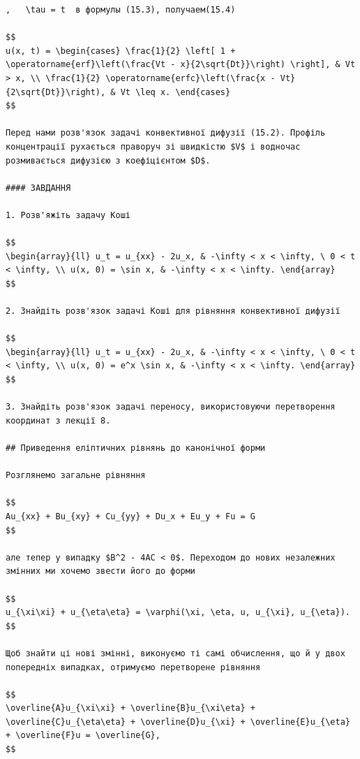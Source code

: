 \documentclass[
  ukrainian,
]{article}
\begin{document}
\begin{verbatim}
,   \tau = t  в формулы (15.3), получаем(15.4)

$$
u(x, t) = \begin{cases} \frac{1}{2} \left[ 1 + \operatorname{erf}\left(\frac{Vt - x}{2\sqrt{Dt}}\right) \right], & Vt > x, \\ \frac{1}{2} \operatorname{erfc}\left(\frac{x - Vt}{2\sqrt{Dt}}\right), & Vt \leq x. \end{cases}
$$

Перед нами розв'язок задачі конвективної дифузії (15.2). Профіль концентрації рухається праворуч зі швидкістю $V$ і водночас розмивається дифузією з коефіцієнтом $D$.

#### ЗАВДАННЯ

1. Розв'яжіть задачу Коші

$$
\begin{array}{ll} u_t = u_{xx} - 2u_x, & -\infty < x < \infty, \ 0 < t < \infty, \\ u(x, 0) = \sin x, & -\infty < x < \infty. \end{array}
$$

2. Знайдіть розв'язок задачі Коші для рівняння конвективної дифузії

$$
\begin{array}{ll} u_t = u_{xx} - 2u_x, & -\infty < x < \infty, \ 0 < t < \infty, \\ u(x, 0) = e^x \sin x, & -\infty < x < \infty. \end{array}
$$

3. Знайдіть розв'язок задачі переносу, використовуючи перетворення координат з лекції 8.

## Приведення еліптичних рівнянь до канонічної форми

Розглянемо загальне рівняння

$$
Au_{xx} + Bu_{xy} + Cu_{yy} + Du_x + Eu_y + Fu = G
$$

але тепер у випадку $B^2 - 4AC < 0$. Переходом до нових незалежних змінних ми хочемо звести його до форми

$$
u_{\xi\xi} + u_{\eta\eta} = \varphi(\xi, \eta, u, u_{\xi}, u_{\eta}).
$$

Щоб знайти ці нові змінні, виконуємо ті самі обчислення, що й у двох попередніх випадках, отримуємо перетворене рівняння

$$
\overline{A}u_{\xi\xi} + \overline{B}u_{\xi\eta} + \overline{C}u_{\eta\eta} + \overline{D}u_{\xi} + \overline{E}u_{\eta} + \overline{F}u = \overline{G},
$$


\end{verbatim}
\end{document}
